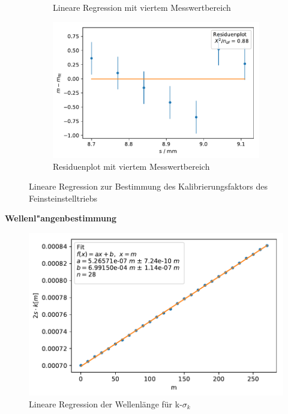 \documentclass[12pt,a4paper]{article}
\begin{document}
\begin{figure}[H]
\begin{subfigure}{0.49\textwidth}
		\caption{Lineare Regression mit viertem Messwertbereich}
		\label{k4LinReg}
	\end{subfigure}
	\begin{subfigure}{0.49\textwidth}
		\centering
		\includegraphics[width=\linewidth]{Python/Uebersetzungsfaktor4_Residuen.pdf}
		\caption{Residuenplot mit viertem Messwertbereich}
		\label{k4ResPlot}
	\end{subfigure}
	\caption{Lineare Regression zur Bestimmung des Kalibrierungsfaktors des Feinsteinstelltriebs}
\end{figure}
\newpage
\textbf{Wellenl"angenbestimmung}
\begin{figure}[H]
	\centering
	\includegraphics[scale=1.0]{Python/Lambdagruen_LinReg2.pdf}
	\caption{Lineare Regression der Wellenlänge für k-$\sigma_k$}
\end{figure}
\end{document}
